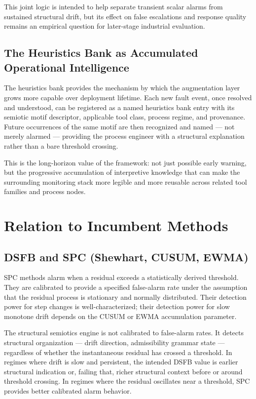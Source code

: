 \documentclass[11pt,letterpaper]{article}
\theoremstyle{scresult}
\begin{document}
This joint logic is intended to help separate transient scalar alarms from
sustained structural drift, but its effect on false escalations and response
quality remains an empirical question for later-stage industrial evaluation.

\subsection{The Heuristics Bank as Accumulated Operational Intelligence}

The heuristics bank provides the mechanism by which the augmentation layer
grows more capable over deployment lifetime. Each new fault event, once
resolved and understood, can be registered as a named heuristics bank entry
with its semiotic motif descriptor, applicable tool class, process regime,
and provenance. Future occurrences of the same motif are then recognized
and named --- not merely alarmed --- providing the process engineer with a
structural explanation rather than a bare threshold crossing.

This is the long-horizon value of the framework: not just possible early
warning, but the progressive accumulation of interpretive knowledge that can
make the surrounding monitoring stack more legible and more reusable across
related tool families and process nodes.

\section{Relation to Incumbent Methods}
\label{sec:incumbent}

\subsection{DSFB and SPC (Shewhart, CUSUM, EWMA)}

SPC methods alarm when a residual exceeds a statistically derived threshold.
They are calibrated to provide a specified false-alarm rate under the assumption
that the residual process is stationary and normally distributed. Their
detection power for step changes is well-characterized; their detection power
for slow monotone drift depends on the CUSUM or EWMA accumulation parameter.

The structural semiotics engine is not calibrated to false-alarm rates. It
detects structural organization --- drift direction, admissibility grammar
state --- regardless of whether the instantaneous residual has crossed a
threshold. In regimes where drift is slow and persistent, the intended DSFB
value is earlier structural indication or, failing that, richer structural
context before or around threshold crossing. In regimes where the residual
oscillates near a threshold, SPC provides better calibrated alarm behavior.
\end{document}

